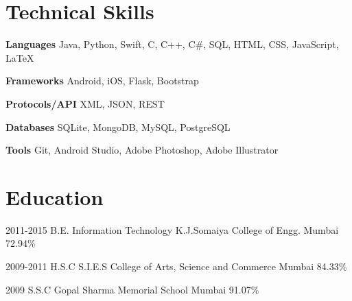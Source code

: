 \documentclass[10pt, a4paper, sans]{moderncv}
\begin{document}


\section{Technical Skills}
\cvitem
{\bfseries{Languages}}
{Java, Python, Swift, C, C++, C\#, SQL, HTML, CSS, JavaScript, \LaTeX{}}

\cvitem
{\bfseries{Frameworks}}
{Android, iOS, Flask, Bootstrap}

\cvitem
{\bfseries{Protocols/API}}
{XML, JSON, REST}

\cvitem
{\bfseries{Databases}}
{SQLite, MongoDB, MySQL, PostgreSQL}

\cvitem
{\bfseries{Tools}}
{Git, Android Studio, Adobe Photoshop, Adobe Illustrator}

\section{Education}
\cventry
{2011-2015}
{B.E. Information Technology}
{K.J.Somaiya College of Engg.}
{Mumbai}
{72.94\%}
{}

\cventry
{2009-2011}
{H.S.C}
{S.I.E.S College of Arts, Science and Commerce}
{Mumbai}
{84.33\%}
{}

\cventry
{2009}
{S.S.C}
{Gopal Sharma Memorial School}
{Mumbai}
{91.07\%}
{}
\end{document}
